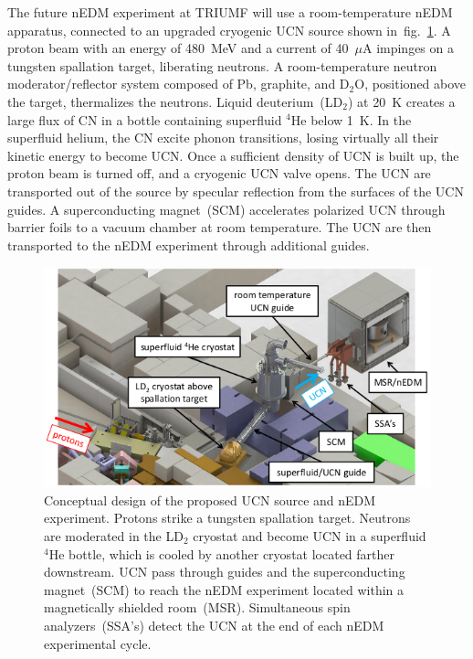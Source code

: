 The future nEDM experiment at TRIUMF will use a room-temperature nEDM
apparatus, connected to an upgraded cryogenic UCN source shown
in~fig.~\ref{fig:triumfEDM}. A proton beam with an energy of 480~MeV
and a current of 40~$\mu$A impinges on a tungsten spallation target,
liberating neutrons. A room-temperature neutron moderator/reflector
system composed of Pb, graphite, and D$_2$O, positioned above the
target, thermalizes the neutrons. Liquid deuterium~(LD$_2$) at 20~K
creates a large flux of CN in a bottle containing superfluid $^4$He
below 1~K. In the superfluid helium, the CN excite phonon transitions,
losing virtually all their kinetic energy to become UCN. Once a
sufficient density of UCN is built up, the proton beam is turned off,
and a cryogenic UCN valve opens. The UCN are transported out of the
source by specular reflection from the surfaces of the UCN guides. A
superconducting magnet~(SCM) accelerates polarized UCN through barrier
foils to a vacuum chamber at room temperature. The UCN are then
transported to the nEDM experiment through additional guides.



\begin{figure}[h!]
  \centering
  \includegraphics[width=1.0\textwidth]{edmtriumf.png}
  \caption[Conceptual design of TUCAN's future nEDM
  facility]{Conceptual design of the proposed UCN source and nEDM
    experiment. Protons strike a tungsten spallation target. Neutrons
    are moderated in the LD$_2$ cryostat and become UCN in a
    superfluid $^4$He bottle, which is cooled by another cryostat
    located farther downstream. UCN pass through guides and the
    superconducting magnet~(SCM) to reach the nEDM experiment located
    within a magnetically shielded room~(MSR). Simultaneous spin
    analyzers~(SSA’s) detect the UCN at the end of each nEDM
    experimental cycle.  }
  \label{fig:triumfEDM}
\end{figure}

